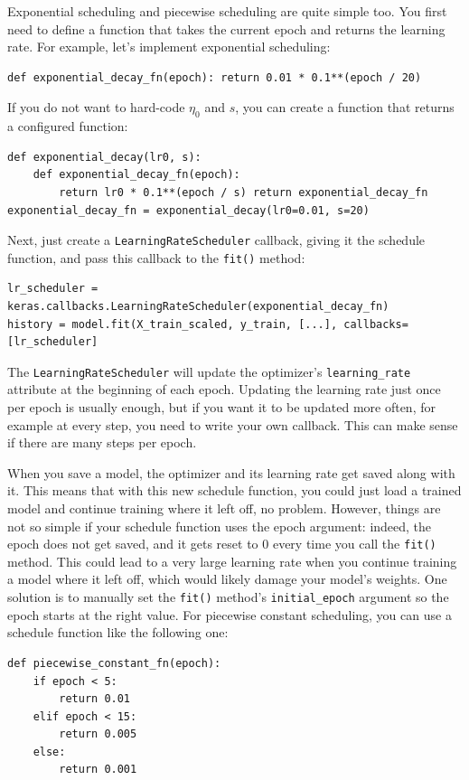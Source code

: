 \documentclass[12pt, letterpaper]{article}
\theoremstyle{definition}
\let\cd\lstinline
\begin{document}
Exponential scheduling and piecewise scheduling are quite simple too. You first need to define a function that takes the current epoch and returns the learning rate. For example, let's implement exponential scheduling:
\begin{lstlisting}
def exponential_decay_fn(epoch): return 0.01 * 0.1**(epoch / 20)
\end{lstlisting}
If you do not want to hard-code $\eta_0$ and $s$, you can create a function that returns a configured function:
\begin{lstlisting}
def exponential_decay(lr0, s):
	def exponential_decay_fn(epoch):
		return lr0 * 0.1**(epoch / s) return exponential_decay_fn
exponential_decay_fn = exponential_decay(lr0=0.01, s=20)
\end{lstlisting}
Next, just create a \cd+LearningRateScheduler+ callback, giving it the schedule function,
and pass this callback to the \cd+fit()+ method:
\begin{lstlisting}
lr_scheduler = keras.callbacks.LearningRateScheduler(exponential_decay_fn)
history = model.fit(X_train_scaled, y_train, [...], callbacks=[lr_scheduler]
\end{lstlisting}
The \cd+LearningRateScheduler+ will update the optimizer's \cd+learning_rate+ attribute at the beginning of each epoch. Updating the learning rate just once per epoch is usually enough, but if you want it to be updated more often, for example at every step, you need to write your own callback. This can make sense if there are many steps per epoch.

When you save a model, the optimizer and its learning rate get saved along with it. This means that with this new schedule function, you could just load a trained model and continue training where it left off, no problem. However, things are not so simple if your schedule function uses the epoch argument: indeed, the epoch does not get saved, and it gets reset to $0$ every time you call the \cd+fit()+ method. This could lead to a very large learning rate when you continue training a model where it left off, which would likely damage your model's weights. One solution is to manually set the \cd+fit()+ method's \cd+initial_epoch+ argument so the epoch starts at the right value. For piecewise constant scheduling, you can use a schedule function like the following one:
\begin{lstlisting}
def piecewise_constant_fn(epoch):
	if epoch < 5:
		return 0.01 
	elif epoch < 15: 
		return 0.005
	else:
		return 0.001
\end{lstlisting}
\end{document}
